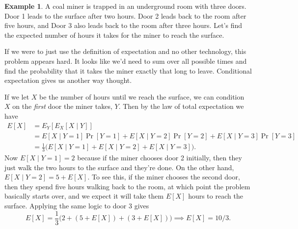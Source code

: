 \documentclass[12pt]{article}
\theoremstyle{plain}
\theoremstyle{definition}
\newtheorem{example}[theorem]{Example}
\theoremstyle{remark}
\begin{document}
\begin{example}
    A coal miner is trapped in an underground room with three doors. Door 1 leads to the surface after two hours.
    Door 2 leads back to the room after five hours, and Door 3 also leads back to the room after three hours.
    Let's find the expected number of hours it takes for the miner to reach the surface.

    If we were to just use the definition of expectation and no other technology, this problem appears hard.
    It looks like we'd need to sum over all possible times and find the probability that it takes the miner exactly that long to leave.
    Conditional expectation gives us another way thought.

    If we let $X$ be the number of hours until we reach the surface, we can condition $X$ on the \emph{first} door the miner takes, $Y$.
    Then by the law of total expectation we have
    \begin{align*}
        E[X] &= E_Y[E_X[X\mid Y]]\\
        &= E[X\mid Y = 1]\Pr[Y=1] + E[X\mid Y=2]\Pr[Y=2] + E[X\mid Y=3]\Pr[Y=3]\\
        &= \frac{1}{3}\big( E[X\mid Y=1] + E[X\mid Y=2] + E[X\mid Y=3]\big).
    \end{align*}
    Now $E[X\mid Y=1] = 2$ because if the miner chooses door 2 initially, then they just walk the two hours to the surface and they're done.
    On the other hand, $E[X\mid Y = 2] = 5+E[X]$.
    To see this, if the miner chooses the second door, then they spend five hours walking back to the room, at which point the problem basically starts over, and we expect it will take them $E[X]$ hours to reach the surface.
    Applying the same logic to door 3 gives
    \[
        E[X] = \frac{1}{3}\big(2 + (5+E[X]) + (3+E[X])\big) \implies E[X] = 10/3.
    \]
\end{example}
\end{document}
